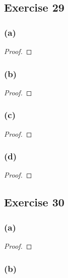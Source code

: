 \documentclass[14pt]{extarticle}
\begin{document}
\subsection{Exercise 29}

\subsubsection{(a)}

\begin{proof}

\end{proof}

\subsubsection{(b)}

\begin{proof}

\end{proof}

\subsubsection{(c)}

\begin{proof}

\end{proof}

\subsubsection{(d)}

\begin{proof}

\end{proof}

\subsection{Exercise 30}

\subsubsection{(a)}

\begin{proof}

\end{proof}

\subsubsection{(b)}
\end{document}
